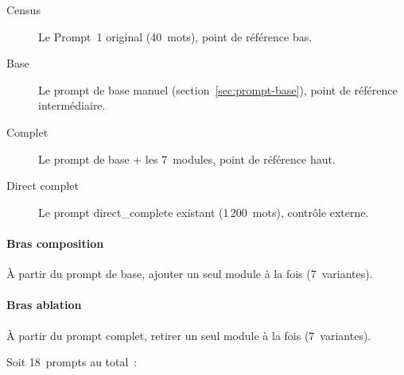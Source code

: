 \begin{description}
\item[Census] Le Prompt~1 original (40~mots), point de référence bas.
\item[Base] Le prompt de base manuel (section~\ref{sec:prompt-base}), point de référence intermédiaire.
\item[Complet] Le prompt de base + les 7~modules, point de référence haut.
\item[Direct complet] Le prompt direct\_complete existant (1\,200~mots), contrôle externe.
\end{description}

\paragraph{Bras composition} À partir du prompt de base, ajouter un seul module
à la fois (7~variantes).

\paragraph{Bras ablation} À partir du prompt complet, retirer un seul module
à la fois (7~variantes).

\medskip
\noindent Soit 18~prompts au total~:

